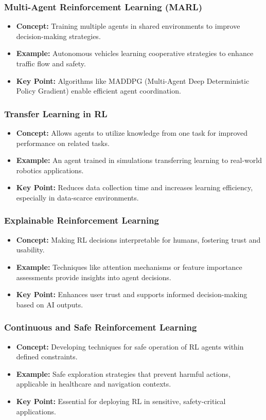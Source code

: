 \documentclass{beamer}
\begin{document}
\begin{frame}[fragile]
    \frametitle{Multi-Agent Reinforcement Learning (MARL)}
    \begin{itemize}
        \item \textbf{Concept:} Training multiple agents in shared environments to improve decision-making strategies.
        \item \textbf{Example:} Autonomous vehicles learning cooperative strategies to enhance traffic flow and safety.
        \item \textbf{Key Point:} Algorithms like MADDPG (Multi-Agent Deep Deterministic Policy Gradient) enable efficient agent coordination.
    \end{itemize}
\end{frame}

\begin{frame}[fragile]
    \frametitle{Transfer Learning in RL}
    \begin{itemize}
        \item \textbf{Concept:} Allows agents to utilize knowledge from one task for improved performance on related tasks.
        \item \textbf{Example:} An agent trained in simulations transferring learning to real-world robotics applications.
        \item \textbf{Key Point:} Reduces data collection time and increases learning efficiency, especially in data-scarce environments.
    \end{itemize}
\end{frame}

\begin{frame}[fragile]
    \frametitle{Explainable Reinforcement Learning}
    \begin{itemize}
        \item \textbf{Concept:} Making RL decisions interpretable for humans, fostering trust and usability.
        \item \textbf{Example:} Techniques like attention mechanisms or feature importance assessments provide insights into agent decisions.
        \item \textbf{Key Point:} Enhances user trust and supports informed decision-making based on AI outputs.
    \end{itemize}
\end{frame}

\begin{frame}[fragile]
    \frametitle{Continuous and Safe Reinforcement Learning}
    \begin{itemize}
        \item \textbf{Concept:} Developing techniques for safe operation of RL agents within defined constraints.
        \item \textbf{Example:} Safe exploration strategies that prevent harmful actions, applicable in healthcare and navigation contexts.
        \item \textbf{Key Point:} Essential for deploying RL in sensitive, safety-critical applications.
    \end{itemize}
\end{frame}
\end{document}
